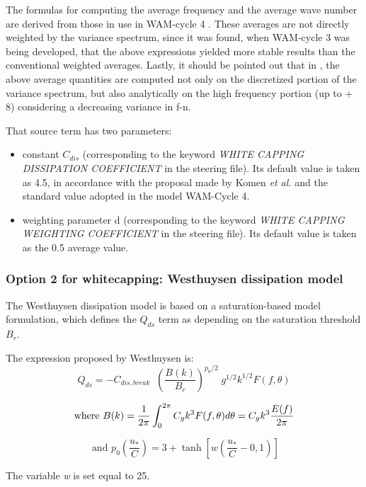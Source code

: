  The formulas for computing the average frequency and the average wave number are derived from those in use in WAM-cycle 4 \cite{Komen1994}. These averages are not directly weighted by the variance spectrum, since it was found, when WAM-cycle 3 \cite {Wamdi1988} was being developed, that the above expressions yielded more stable results than the conventional weighted averages. Lastly, it should be pointed out that in \tomawac, the above average quantities are computed not only on the discretized portion of the variance spectrum, but also analytically on the high frequency portion (up to + 8) considering a decreasing variance in f-n.

That source term has two parameters:

\begin{itemize}
\item  constant $C_{dis}$ (corresponding to the keyword \textit{WHITE CAPPING DISSIPATION COEFFICIENT }in the steering file). Its default value is taken as 4.5, in accordance with the proposal made by Komen \textit{et al.} \cite{Komen1984} and the standard value adopted in the model WAM-Cycle 4.
\item  weighting parameter d (corresponding to the keyword \textit{WHITE CAPPING WEIGHTING COEFFICIENT} in the steering file). Its default value is taken as the 0.5 average value.
\end{itemize}

\subsubsection{Option 2 for whitecapping: Westhuysen dissipation model}
\label{parag4.3.3.2}
 The Westhuysen dissipation model \cite{Westhuys2007} is based on a saturation-based model formulation, which defines the ${Q}_{ds}$ term as depending on the saturation threshold ${B}_{r}$.

 The expression proposed by Westhuysen is:
\begin{equation} \label{GrindEQ__4_40_}
Q_{ds} =-C_{dis,break} \; \; \left(\frac{B(k)}{B_{r} } \right)^{p_{0} /2} \; g^{1/2} k^{1/2} F(f,\theta )
\end{equation}

$$\mbox{where }\displaystyle B(k)=\frac{1}{2\pi } \int _{0}^{2\pi }C_{g} k^{3} F(f,\theta )d\theta  =C_{g} k^{3} \frac{E(f)}{2\pi } $$

$$\mbox{ and }p_{0} \left(\frac{u_{*} }{C} \right)=3+\tanh \left[w\left(\frac{u_{*} }{C} -0,1\right)\right]$$

 The variable \textit{w} is set equal to 25.

